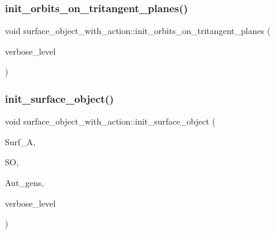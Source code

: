 \mbox{\label{classsurface__object__with__action_abbe5e8be1fa58b2f180ce99bb6a549d2}} 
\subsubsection{\texorpdfstring{init\+\_\+orbits\+\_\+on\+\_\+tritangent\+\_\+planes()}{init\_orbits\_on\_tritangent\_planes()}}
{\footnotesize\ttfamily void surface\+\_\+object\+\_\+with\+\_\+action\+::init\+\_\+orbits\+\_\+on\+\_\+tritangent\+\_\+planes (\begin{DoxyParamCaption}\item[{\mbox{\hyperlink{galois_8h_a09fddde158a3a20bd2dcadb609de11dc}{I\+NT}}}]{verbose\+\_\+level }\end{DoxyParamCaption})}

\mbox{\label{classsurface__object__with__action_addc93dd533dbceb5c024c66ee1936d35}} 
\subsubsection{\texorpdfstring{init\+\_\+surface\+\_\+object()}{init\_surface\_object()}}
{\footnotesize\ttfamily void surface\+\_\+object\+\_\+with\+\_\+action\+::init\+\_\+surface\+\_\+object (\begin{DoxyParamCaption}\item[{\mbox{\hyperlink{classsurface__with__action}{surface\+\_\+with\+\_\+action}} $\ast$}]{Surf\+\_\+A,  }\item[{\mbox{\hyperlink{classsurface__object}{surface\+\_\+object}} $\ast$}]{SO,  }\item[{\mbox{\hyperlink{classstrong__generators}{strong\+\_\+generators}} $\ast$}]{Aut\+\_\+gens,  }\item[{\mbox{\hyperlink{galois_8h_a09fddde158a3a20bd2dcadb609de11dc}{I\+NT}}}]{verbose\+\_\+level }\end{DoxyParamCaption})}

